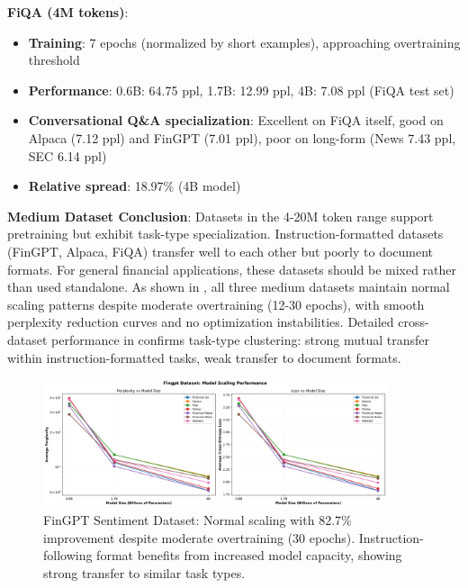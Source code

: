 \textbf{FiQA (4M tokens)}:
\begin{itemize}
\item \textbf{Training}: 7 epochs (normalized by short examples), approaching overtraining threshold
\item \textbf{Performance}: 0.6B: 64.75 ppl, 1.7B: 12.99 ppl, 4B: 7.08 ppl (FiQA test set)
\item \textbf{Conversational Q\&A specialization}: Excellent on FiQA itself, good on Alpaca (7.12 ppl) and FinGPT (7.01 ppl), poor on long-form (News 7.43 ppl, SEC 6.14 ppl)
\item \textbf{Relative spread}: 18.97\% (4B model)
\end{itemize}

\textbf{Medium Dataset Conclusion}: Datasets in the 4-20M token range support pretraining but exhibit task-type specialization. Instruction-formatted datasets (FinGPT, Alpaca, FiQA) transfer well to each other but poorly to document formats. For general financial applications, these datasets should be mixed rather than used standalone. As shown in , all three medium datasets maintain normal scaling patterns despite moderate overtraining (12-30 epochs), with smooth perplexity reduction curves and no optimization instabilities. Detailed cross-dataset performance in  confirms task-type clustering: strong mutual transfer within instruction-formatted tasks, weak transfer to document formats.

\begin{figure}[h]
\centering
\includegraphics[width=0.9\textwidth]{figures/scaling_fingpt.png}
\caption[FinGPT Sentiment Dataset: Scaling Behavior]{FinGPT Sentiment Dataset: Normal scaling with 82.7\% improvement despite moderate overtraining (30 epochs). Instruction-following format benefits from increased model capacity, showing strong transfer to similar task types.}
\label{fig:scaling_fingpt}
\end{figure}

